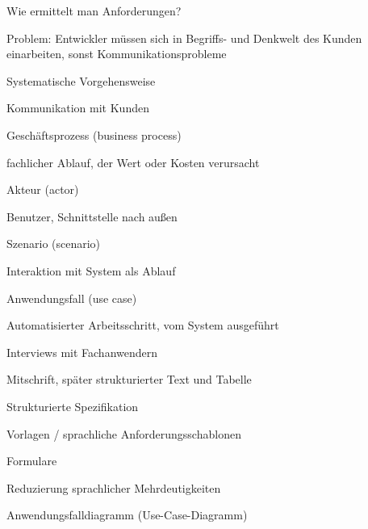 \documentclass[a4paper]{article}
\begin{document}
\begin{multicols}{3}
  Wie ermittelt man Anforderungen?
  \begin{itemize*}
    \item Problem: Entwickler müssen sich in Begriffs- und Denkwelt des Kunden einarbeiten, sonst Kommunikationsprobleme
    \item Systematische Vorgehensweise
    \item Kommunikation mit Kunden
    \item Geschäftsprozess (business process)
          \begin{itemize*}
            \item fachlicher Ablauf, der Wert oder Kosten verursacht
          \end{itemize*}
    \item Akteur (actor)
          \begin{itemize*}
            \item Benutzer, Schnittstelle nach außen
          \end{itemize*}
    \item Szenario (scenario)
          \begin{itemize*}
            \item Interaktion mit System als Ablauf
          \end{itemize*}
    \item Anwendungsfall (use case)
          \begin{itemize*}
            \item Automatisierter Arbeitsschritt, vom System ausgeführt
          \end{itemize*}
    \item Interviews mit Fachanwendern
          \begin{itemize*}
            \item Mitschrift, später strukturierter Text und Tabelle
          \end{itemize*}
    \item Strukturierte Spezifikation
          \begin{itemize*}
            \item Vorlagen / sprachliche Anforderungsschablonen
            \item Formulare
            \item Reduzierung sprachlicher Mehrdeutigkeiten
          \end{itemize*}
    \item Anwendungsfalldiagramm (Use-Case-Diagramm)
          \begin{itemize*}

\end{itemize*}
\end{itemize*}
\end{multicols}
\end{document}
